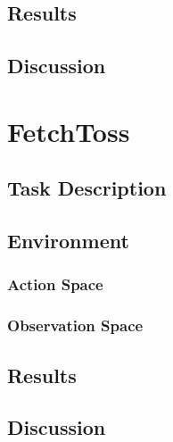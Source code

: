 \subsection{Results}



\subsection{Discussion}





\section{FetchToss}



\subsection{Task Description}



\subsection{Environment}



\subsubsection{Action Space}



\subsubsection{Observation Space}




\subsection{Results}



\subsection{Discussion}